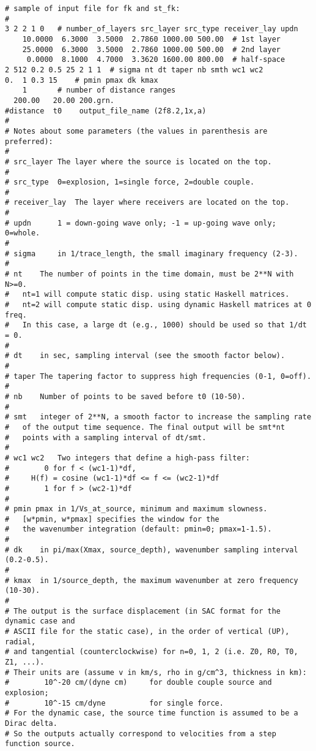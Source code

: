 \documentclass[11pt,titlepage,fleqn]{article}
\begin{document}
\begin{verbatim}
# sample of input file for fk and st_fk:
# 
3 2 2 1 0	# number_of_layers src_layer src_type receiver_lay updn
    10.0000  6.3000  3.5000  2.7860 1000.00 500.00	# 1st layer
    25.0000  6.3000  3.5000  2.7860 1000.00 500.00	# 2nd layer
     0.0000  8.1000  4.7000  3.3620 1600.00 800.00	# half-space
2 512 0.2 0.5 25 2 1 1	# sigma nt dt taper nb smth wc1 wc2
0.  1 0.3 15	# pmin pmax dk kmax
    1		# number of distance ranges
  200.00   20.00 200.grn.
#distance  t0    output_file_name (2f8.2,1x,a)
#
# Notes about some parameters (the values in parenthesis are preferred):
#
# src_layer	The layer where the source is located on the top.
#
# src_type	0=explosion, 1=single force, 2=double couple.
#
# receiver_lay	The layer where receivers are located on the top.
#
# updn		1 = down-going wave only; -1 = up-going wave only; 0=whole.
# 
# sigma		in 1/trace_length, the small imaginary frequency (2-3).
# 
# nt	The number of points in the time domain, must be 2**N with N>=0.
#	nt=1 will compute static disp. using static Haskell matrices.
# 	nt=2 will compute static disp. using dynamic Haskell matrices at 0 freq.
#	In this case, a large dt (e.g., 1000) should be used so that 1/dt = 0.
# 
# dt	in sec, sampling interval (see the smooth factor below).
# 
# taper	The tapering factor to suppress high frequencies (0-1, 0=off).
# 
# nb	Number of points to be saved before t0 (10-50).
# 
# smt	integer of 2**N, a smooth factor to increase the sampling rate
#	of the output time sequence. The final output will be smt*nt
#	points with a sampling interval of dt/smt.
# 
# wc1 wc2	Two integers that define a high-pass filter:
# 		 0 for f < (wc1-1)*df,
# 	  H(f) = cosine (wc1-1)*df <= f <= (wc2-1)*df
# 		 1 for f > (wc2-1)*df
# 
# pmin pmax	in 1/Vs_at_source, minimum and maximum slowness.
# 	[w*pmin, w*pmax] specifies the window for the
#	the wavenumber integration (default: pmin=0; pmax=1-1.5).
# 
# dk	in pi/max(Xmax, source_depth), wavenumber sampling interval (0.2-0.5).
# 
# kmax	in 1/source_depth, the maximum wavenumber at zero frequency (10-30).
# 
# The output is the surface displacement (in SAC format for the dynamic case and
# ASCII file for the static case), in the order of vertical (UP), radial,
# and tangential (counterclockwise) for n=0, 1, 2 (i.e. Z0, R0, T0, Z1, ...).
# Their units are (assume v in km/s, rho in g/cm^3, thickness in km):
#        10^-20 cm/(dyne cm)     for double couple source and explosion;
#        10^-15 cm/dyne          for single force.
# For the dynamic case, the source time function is assumed to be a Dirac delta.
# So the outputs actually correspond to velocities from a step function source.
\end{verbatim}
\end{document}
